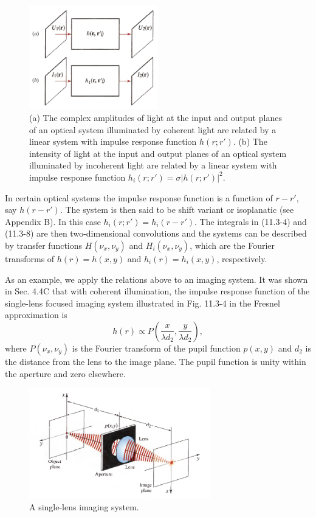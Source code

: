 \documentclass{article}
\numberwithin{figure}{subsection}
\numberwithin{table}{subsection}
\begin{document}
\begin{figure}[H]
\centering
\includegraphics[width=0.5\textwidth]{11_3_3.PNG}
\caption{(a) The complex amplitudes of light at the input and output planes of an optical system illuminated by coherent light are related by a linear system with impulse response function $h(r; r')$. (b) The intensity of light at the input and output planes of an optical system illuminated by incoherent light are related by a linear system with impulse response function $h_i (r; r') = \sigma \lvert h(r; r') \rvert ^2$. }
\label{fig: 11_3_3}
\end{figure}
\par In certain optical systems the impulse response function is a function of $r-r'$, say $h(r - r')$. The system is then said to be shift variant or isoplanatic (see Appendix B). In this case $h_i (r; r') = h_i (r - r')$. The integrals in (11.3-4) and (11.3-8) are then two-dimensional convolutions and the systems can be described by transfer functions $H(\nu_x, \nu_y)$ and $H_i(\nu_x, \nu_y)$, which are the Fourier transforms of $h(r) = h(x,y)$ and  $h_i (r) = h_i (x,y)$, respectively.
\par As an example, we apply the relations above to an imaging system. It was shown in Sec. 4.4C that with coherent illumination, the impulse response function of the single-lens focused imaging system illustrated in Fig. 11.3-4 in the Fresnel approximation is
\begin{equation}
h(r) \propto P(\frac{x}{\lambda d_2}, \frac{y}{\lambda d_2}) ,
\end{equation}
where $P(\nu_x, \nu_y)$ is the Fourier transform of the pupil function $p(x, y)$ and $d_2$ is the distance from the lens to the image plane. The pupil function is unity within the aperture and zero elsewhere.
\begin{figure}[H]
\centering
\includegraphics[width=0.7\textwidth]{11_3_4.PNG}
\caption{A single-lens imaging system.}
\label{fig: 11_3_4}
\end{figure}
\end{document}
